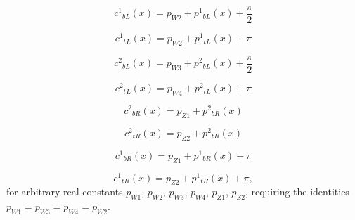 \documentclass[12pt]{article}
\renewcommand\[{\begin{dmath}}
\renewcommand\]{\end{dmath}}
\begin{document}
\[c^1{}_{ {bL}}(x)= p_{ {W2}}+p^1{}_{  {bL}}(x)+\frac{\pi }{2} \]



\[c^1{}_{  {tL}}(x)= p_{  {W2}}+p^1{}_{  {tL}}(x)+\pi  \]



\[c^2{}_{ {bL}}(x)= p_{  {W3}}+p^2{}_{ {bL}}(x)+\frac{\pi }{2}  \]



\[c^2{}_{  {tL}}(x)= p_{  {W4}}+p^2{}_{  {tL}}(x)+\pi  \]



\[c^2{}_{ {bR}}(x)= p_{  {Z1}}+p^2{}_{  {bR}}(x)  \]



\[c^2{}_{ {tR}}(x)= p_{ {Z2}}+p^2{}_{  {tR}}(x)  \]



\[c^1{}_{ {bR}}(x)= p_{  {Z1}}+p^1{}_{  {bR}}(x)+\pi  \]


\[c^1{}_{ {tR}}(x)= p_{  {Z2}}+p^1{}_{  {tR}}(x)+\pi ,  \]
for arbitrary real constants $ p_{  {W1}}$, $ p_{  {W2}}$, $ p_{  {W3}}$, $ p_{  {W4}}$, $ p_{  {Z1}}$,  $ p_{  {Z2}}$,
requiring the identities
$ p_{  {W1}}= p_{  {W3}}=p_{  {W4}}=p_{  {W2}}$.
\end{document}
